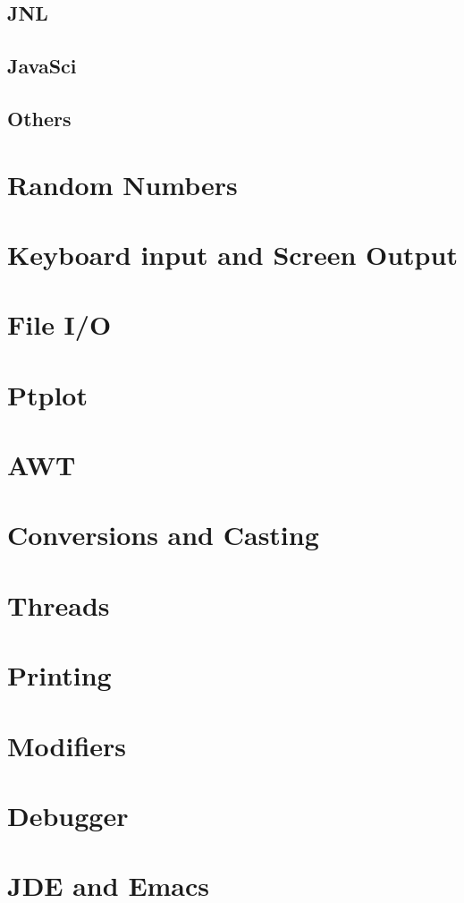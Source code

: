 \subsection{JNL}
\subsection{JavaSci}
\subsection{Others}
\label{sec:Others}
\section{Random Numbers}
\section{Keyboard input and Screen Output}
\section{File I/O}
\section{Ptplot}
\section{AWT}
\section{Conversions and Casting}
\section{Threads}
\section{Printing}
\section{Modifiers}
\section{Debugger}
\section{JDE and Emacs}

